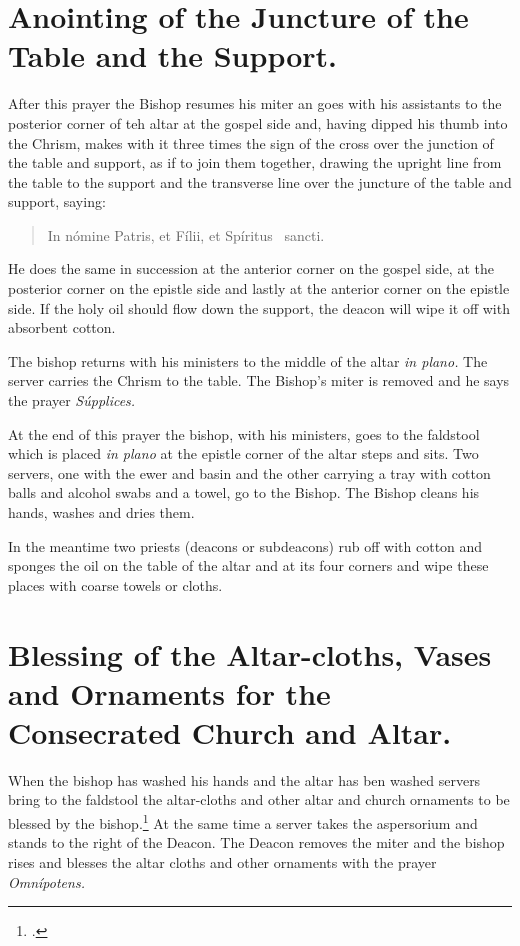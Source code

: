 \documentclass[letterpaper]{report}
\begin{document}
{\section{Anointing of the Juncture of the Table and the Support.}

\rubric After this prayer the Bishop resumes his miter an goes with his
assistants to the posterior corner of teh altar at the gospel side and, having
dipped his thumb into the Chrism, makes with it three times the sign of the
cross over the junction of the table and support, as if to join them together,
drawing the upright line from the table to the support and the transverse line
over the juncture of the table and support, saying:

\begin{quote}
    In nómine Pa\cross tris, et Fí\cross lii, et Spíritus \cross\ sancti.
\end{quote}

He does the same in succession at the anterior corner on the gospel side, at
the posterior corner on the epistle side and lastly at the anterior corner on
the epistle side. If the holy oil should flow down the support, the deacon will
wipe it off with absorbent cotton.

\rubric The bishop returns with his ministers to the middle of the altar
\textit{in plano.} The server carries the Chrism to the table. The Bishop's
miter is removed and he says the prayer \textit{Súpplices.}

\rubric At the end of this prayer the bishop, with his ministers, goes to the
faldstool which is placed \textit{in plano} at the epistle corner of the altar
steps and sits. Two servers, one with the ewer and basin and the other carrying
a tray with cotton balls and alcohol swabs and a towel, go to the Bishop. The
Bishop cleans his hands, washes and dries them.

In the meantime two priests (deacons or subdeacons) rub off with cotton and
sponges the oil on the table of the altar and at its four corners and wipe
these places with coarse towels or cloths.

\section{Blessing of the Altar-cloths, Vases and Ornaments for the Consecrated Church and Altar.}

\rubric When the bishop has washed his hands and the altar has ben washed
servers bring to the faldstool the altar-cloths and other altar and church
ornaments to be blessed by the bishop.\footcite[In case they should be very
numerous, they may be left on a table to which the bishop goes and there
blesses them.][footnote 4, p. 128.]{consecranda} At the same time a server
takes the aspersorium and stands to the right of the Deacon. The Deacon removes
the miter and the bishop rises and blesses the altar cloths and other ornaments
with the prayer \textit{Omnípotens.}

}
\end{document}
